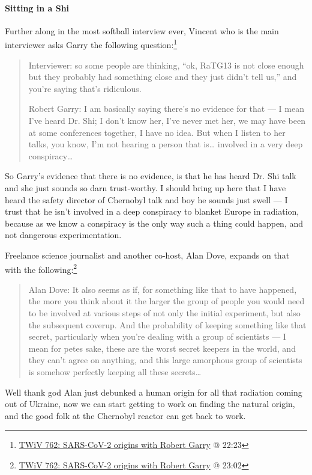 \documentclass[11pt]{article}
\begin{document}
\paragraph{Sitting in a Shi}
\label{sec:org03cdf8e}
Further along in the most softball interview ever, Vincent who is the main interviewer asks Garry the following question:\footnote{\href{https://youtu.be/IxwrDSYrhjU?t=1343}{TWiV 762: SARS-CoV-2 origins with Robert Garry} @ 22:23}
\begin{quote}
Interviewer: so some people are thinking, ``ok, RaTG13 is not close enough but they probably had something close and they just didn't tell us,'' and you're saying that's ridiculous.

Robert Garry: I am basically saying there's no evidence for that --- I mean I've heard Dr. Shi; I don't know her, I've never met her, we may have been at some conferences together, I have no idea. But when I listen to her talks, you know, I'm not hearing a person that is\ldots{} involved in a very deep conspiracy\ldots{}
\end{quote}
So Garry's evidence that there is no evidence, is that he has heard Dr. Shi talk and she just sounds so darn trust-worthy. I should bring up here that I have heard the safety director of Chernobyl talk and boy he sounds just swell --- I trust that he isn't involved in a deep conspiracy to blanket Europe in radiation, because as we know a conspiracy is the only way such a thing could happen, and not dangerous experimentation.

Freelance science journalist and another co-host, Alan Dove, expands on that with the following:\footnote{\href{https://www.youtube.com/watch?v=IxwrDSYrhjU\&t=1382s}{TWiV 762: SARS-CoV-2 origins with Robert Garry} @ 23:02}
\begin{quote}
Alan Dove: It also seems as if, for something like that to have happened, the more you think about it the larger the group of people you would need to be involved at various steps of not only the initial experiment, but also the subsequent coverup. And the probability of keeping something like that secret, particularly when you're dealing with a group of scientists --- I mean for petes sake, these are the worst secret keepers in the world, and they can't agree on anything, and this large amorphous group of scientists is somehow perfectly keeping all these secrets\ldots{}
\end{quote}
Well thank god Alan just debunked a human origin for all that radiation coming out of Ukraine, now we can start getting to work on finding the natural origin, and the good folk at the Chernobyl reactor can get back to work.
\end{document}

